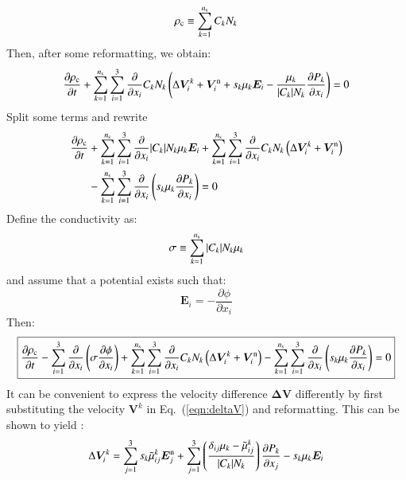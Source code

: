 \documentclass{warpdoc}
\newcommand{\alb}{\vspace{0.2cm}\\} %
\newcommand{\ns}{{n_{\rm s}}}
\newcommand\frameeqn[1]{\fbox{$\displaystyle #1$}}
\newcommand{\nd}{3}
\renewcommand{\vec}[1]{\bm{#1}}
\begin{document}
%
\begin{equation}
\rho_{\rm c}\equiv
\sum_{k=1}^\ns C_k N_k
\end{equation}
%
Then, after some reformatting, we obtain:
%
\begin{equation}
  \frac{\partial \rho_{\rm c}}{\partial t} + \sum_{k=1}^\ns\sum_{i=1}^3 \frac{\partial}{\partial x_i} C_k N_k \left(\Delta \vec{V}^k_i+\vec{V}^{\rm n}_i+ s_k \mu_k  \vec{E}_i  -   \frac{\mu_k}{|C_k| N_k} \frac{\partial P_k}{\partial x_i} \right) = 0
\end{equation}
%
Split some terms and rewrite
%
\begin{align}
  \frac{\partial \rho_{\rm c}}{\partial t} 
&+ \sum_{k=1}^\ns\sum_{i=1}^3 \frac{\partial}{\partial x_i} |C_k| N_k  \mu_k  \vec{E}_i   
+ \sum_{k=1}^\ns\sum_{i=1}^3 \frac{\partial}{\partial x_i} C_k N_k \left(\Delta \vec{V}^k_i+\vec{V}^{\rm n}_i \right) \nonumber\alb
&- \sum_{k=1}^\ns\sum_{i=1}^3 \frac{\partial}{\partial x_i}  \left({s_k \mu_k} \frac{\partial P_k}{\partial x_i} \right) 
= 0
\end{align}
%
Define the conductivity as:
%
\begin{equation}
\sigma \equiv \sum_{k=1}^\ns |C_k| N_k \mu_k
\end{equation}
%
and assume that a potential exists such that:
%
\begin{equation}
\vec{E}_i = -\frac{\partial \phi}{\partial x_i}
\end{equation}
%
Then:
%
\begin{equation}
\frameeqn{
  \frac{\partial \rho_{\rm c}}{\partial t} 
- \sum_{i=1}^3 \frac{\partial}{\partial x_i}\left( \sigma  \frac{\partial \phi}{\partial x_i}   \right)
+ \sum_{k=1}^\ns\sum_{i=1}^3 \frac{\partial}{\partial x_i} C_k N_k \left(\Delta \vec{V}^k_i+\vec{V}^{\rm n}_i \right) 
- \sum_{k=1}^\ns\sum_{i=1}^3 \frac{\partial}{\partial x_i}  \left({s_k \mu_k} \frac{\partial P_k}{\partial x_i} \right) 
= 0
}
\label{eqn:phitransport}
\end{equation}
%
It can be convenient to express the velocity difference $\vec{\Delta V}$ differently by first substituting the velocity $\vec{V}^k$ in Eq.\ (\ref{eqn:deltaV}) and reformatting. This can be shown to yield \cite{jcp:2015:parent}:
%
\begin{equation}
 \Delta \vec{V}_i^k = 
   \sum_{j=1}^\nd s_k \wtilde{\mu}^k_{ij}  \vec{E}_j^{\rm n}
      + \sum_{j=1}^\nd  \left(\frac{\delta_{ij} \mu_k-\wtilde{\mu}^{k}_{ij}}{|C_k| N_k}\right) \frac{\partial P_k}{\partial x_j}
-  s_k \mu_k  \vec{E}_i
\end{equation}
%
\end{document}
